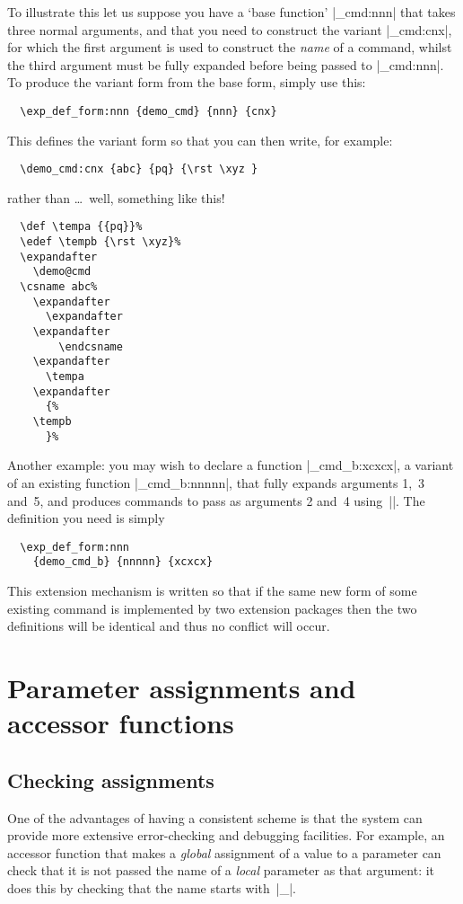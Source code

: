 \documentclass{article}
\begin{document}
To illustrate this let us suppose you have a `base function'
|\demo_cmd:nnn| that takes three normal arguments, and that you need
to construct the variant |\demo_cmd:cnx|, for which the first argument
is used to construct the \emph{name} of a command, whilst the third
argument must be fully expanded before being passed to
|\demo_cmd:nnn|.
To produce the variant form from the base form, simply use this:
\begin{verbatim}
  \exp_def_form:nnn {demo_cmd} {nnn} {cnx} 
\end{verbatim}
This defines the variant form so that you can then write, for example:
\begin{verbatim}
  \demo_cmd:cnx {abc} {pq} {\rst \xyz }
\end{verbatim}
rather than \ldots\ well, something like this!
\begin{verbatim}
  \def \tempa {{pq}}%
  \edef \tempb {\rst \xyz}%
  \expandafter
    \demo@cmd 
  \csname abc%
    \expandafter
      \expandafter
    \expandafter
        \endcsname
    \expandafter
      \tempa
    \expandafter
      {%
    \tempb
      }%
\end{verbatim}

Another example: you may wish to declare a function
|\demo_cmd_b:xcxcx|, a variant of an existing function
|\demo_cmd_b:nnnnn|, that fully
expands arguments 1,~3 and~5, and produces commands to pass as
arguments 2 and~4 using~|\csname|.
The definition you need is simply
\begin{verbatim}
  \exp_def_form:nnn
    {demo_cmd_b} {nnnnn} {xcxcx}
\end{verbatim}

This extension mechanism is written so that if the same new form of 
some existing command is implemented by two extension packages then the
two definitions will be identical and thus no conflict will occur.


\section{Parameter assignments and accessor functions}
\label{sec:access}

\subsection{Checking assignments}
\label{sec:check}

One of the advantages of having a consistent scheme is that the system
can provide more extensive error-checking and debugging facilities.
For example, an accessor function that makes a \emph{global}
assignment of a value to a parameter can check that it is not passed
the name of a \emph{local} parameter as that argument: it does this by
checking that the name starts with~|\g_|.
\end{document}
